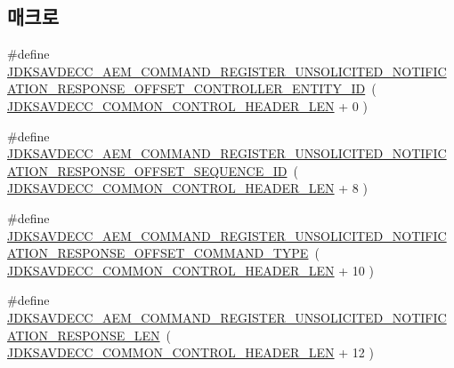 \subsection*{매크로}
\begin{DoxyCompactItemize}
\item 
\#define \hyperlink{group__command__register__unsolicited__notification__response_gafaddde566434d1826bc05716367e6869}{J\+D\+K\+S\+A\+V\+D\+E\+C\+C\+\_\+\+A\+E\+M\+\_\+\+C\+O\+M\+M\+A\+N\+D\+\_\+\+R\+E\+G\+I\+S\+T\+E\+R\+\_\+\+U\+N\+S\+O\+L\+I\+C\+I\+T\+E\+D\+\_\+\+N\+O\+T\+I\+F\+I\+C\+A\+T\+I\+O\+N\+\_\+\+R\+E\+S\+P\+O\+N\+S\+E\+\_\+\+O\+F\+F\+S\+E\+T\+\_\+\+C\+O\+N\+T\+R\+O\+L\+L\+E\+R\+\_\+\+E\+N\+T\+I\+T\+Y\+\_\+\+ID}~( \hyperlink{group__jdksavdecc__avtp__common__control__header_gaae84052886fb1bb42f3bc5f85b741dff}{J\+D\+K\+S\+A\+V\+D\+E\+C\+C\+\_\+\+C\+O\+M\+M\+O\+N\+\_\+\+C\+O\+N\+T\+R\+O\+L\+\_\+\+H\+E\+A\+D\+E\+R\+\_\+\+L\+EN} + 0 )
\item 
\#define \hyperlink{group__command__register__unsolicited__notification__response_ga00771f40a512d3db528c2d85a1b6b9f7}{J\+D\+K\+S\+A\+V\+D\+E\+C\+C\+\_\+\+A\+E\+M\+\_\+\+C\+O\+M\+M\+A\+N\+D\+\_\+\+R\+E\+G\+I\+S\+T\+E\+R\+\_\+\+U\+N\+S\+O\+L\+I\+C\+I\+T\+E\+D\+\_\+\+N\+O\+T\+I\+F\+I\+C\+A\+T\+I\+O\+N\+\_\+\+R\+E\+S\+P\+O\+N\+S\+E\+\_\+\+O\+F\+F\+S\+E\+T\+\_\+\+S\+E\+Q\+U\+E\+N\+C\+E\+\_\+\+ID}~( \hyperlink{group__jdksavdecc__avtp__common__control__header_gaae84052886fb1bb42f3bc5f85b741dff}{J\+D\+K\+S\+A\+V\+D\+E\+C\+C\+\_\+\+C\+O\+M\+M\+O\+N\+\_\+\+C\+O\+N\+T\+R\+O\+L\+\_\+\+H\+E\+A\+D\+E\+R\+\_\+\+L\+EN} + 8 )
\item 
\#define \hyperlink{group__command__register__unsolicited__notification__response_gaca328373c7e4e4640ea591c940ab5b3a}{J\+D\+K\+S\+A\+V\+D\+E\+C\+C\+\_\+\+A\+E\+M\+\_\+\+C\+O\+M\+M\+A\+N\+D\+\_\+\+R\+E\+G\+I\+S\+T\+E\+R\+\_\+\+U\+N\+S\+O\+L\+I\+C\+I\+T\+E\+D\+\_\+\+N\+O\+T\+I\+F\+I\+C\+A\+T\+I\+O\+N\+\_\+\+R\+E\+S\+P\+O\+N\+S\+E\+\_\+\+O\+F\+F\+S\+E\+T\+\_\+\+C\+O\+M\+M\+A\+N\+D\+\_\+\+T\+Y\+PE}~( \hyperlink{group__jdksavdecc__avtp__common__control__header_gaae84052886fb1bb42f3bc5f85b741dff}{J\+D\+K\+S\+A\+V\+D\+E\+C\+C\+\_\+\+C\+O\+M\+M\+O\+N\+\_\+\+C\+O\+N\+T\+R\+O\+L\+\_\+\+H\+E\+A\+D\+E\+R\+\_\+\+L\+EN} + 10 )
\item 
\#define \hyperlink{group__command__register__unsolicited__notification__response_ga25450d50a8a3a6d8a0094181bd597ec9}{J\+D\+K\+S\+A\+V\+D\+E\+C\+C\+\_\+\+A\+E\+M\+\_\+\+C\+O\+M\+M\+A\+N\+D\+\_\+\+R\+E\+G\+I\+S\+T\+E\+R\+\_\+\+U\+N\+S\+O\+L\+I\+C\+I\+T\+E\+D\+\_\+\+N\+O\+T\+I\+F\+I\+C\+A\+T\+I\+O\+N\+\_\+\+R\+E\+S\+P\+O\+N\+S\+E\+\_\+\+L\+EN}~( \hyperlink{group__jdksavdecc__avtp__common__control__header_gaae84052886fb1bb42f3bc5f85b741dff}{J\+D\+K\+S\+A\+V\+D\+E\+C\+C\+\_\+\+C\+O\+M\+M\+O\+N\+\_\+\+C\+O\+N\+T\+R\+O\+L\+\_\+\+H\+E\+A\+D\+E\+R\+\_\+\+L\+EN} + 12 )
\end{DoxyCompactItemize}
